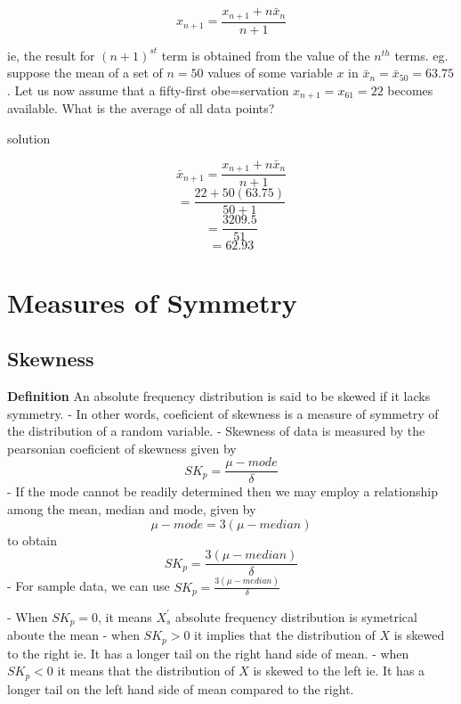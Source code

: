 \documentclass[12pt,a4paper]{article}
\begin{document}
\begin{equation}
    x_{n + 1} = \frac{x_{n+1} + n\bar{x}_n}{n + 1}
\end{equation}

ie, the result for $(n + 1)^{st}$ term is obtained from the value of the $n^{th}$ terms.
eg. suppose the mean of a set of $n = 50$ values of some variable $x$ in $\bar{x}_n = \bar{x}_{50} = 63.75$. Let us now assume that a fifty-first obe=servation $x_{n + 1} = x_{61} = 22$ becomes available. What is the average of all data points?

solution



\begin{center}
    \[\bar{x}_{n + 1} = \frac{x_{n+1} + n\bar{x}_n}{n + 1}\]
    \[= \frac{22 + 50(63.75)}{50 + 1}\]
    \[= \frac{3209.5}{51}\]
    \[= 62.93\]
\end{center}


\section{Measures of Symmetry}
\subsection{Skewness}
\textbf{Definition} An absolute frequency distribution is said to be skewed if it lacks symmetry.
- In other words, coeficient of skewness is a measure of symmetry of the distribution of a random variable.
- Skewness of data is measured by the pearsonian coeficient of skewness given by
\begin{equation}
    SK_p = \frac{\mu - mode}{\delta}
\end{equation}
- If the mode cannot be readily determined then we may employ a relationship among the mean, median and mode, given by
\begin{equation}
    \mu - mode = 3(\mu - median)
\end{equation}
to obtain
\begin{equation}
    SK_p = \frac{3(\mu - median)}{\delta}
\end{equation}
- For sample data, we can use $SK_p = \frac{3(\mu - median)}{\delta}$

- When $SK_p = 0$, it means $X_s^{'}$ absolute frequency distribution is symetrical aboute the mean
- when $SK_p > 0$ it implies that the distribution of $X$ is skewed to the right ie. It has a longer tail on the right hand side of mean.
- when $SK_p < 0$ it means that the distribution of $X$ is skewed to the left ie. It has a longer tail on the left hand side of mean compared to the right.
\end{document}
